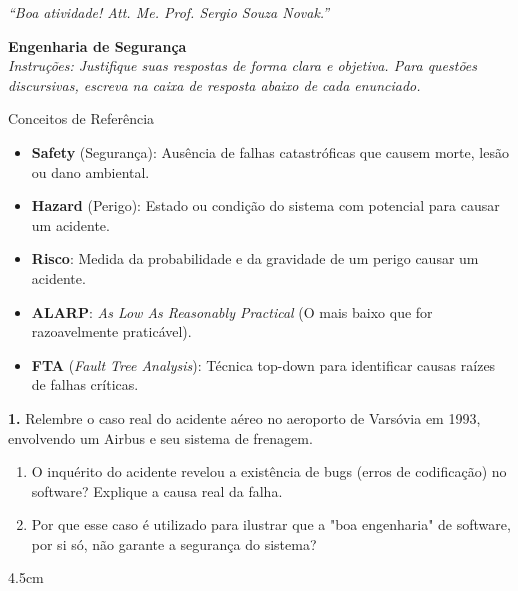 \documentclass[12pt,a4paper,twoside]{report}
\begin{document}
\vspace{0.8cm}

\begin{center}
  \textit{``Boa atividade! Att. Me. Prof. Sergio Souza Novak.''}
\end{center}

\vspace*{0.2cm}

\begin{center}
  {\Large \textbf{Engenharia de Segurança}}\\[0.2cm]
  \textit{Instruções: Justifique suas respostas de forma clara e objetiva.
  Para questões discursivas, escreva na caixa de resposta abaixo de cada enunciado.}
\end{center}

\vspace{0.4cm}

\begin{block}{Conceitos de Referência}
  \small
  \begin{itemize}
    \item \textbf{Safety} (Segurança): Ausência de falhas catastróficas que causem morte, lesão ou dano ambiental.
    \item \textbf{Hazard} (Perigo): Estado ou condição do sistema com potencial para causar um acidente.
    \item \textbf{Risco}: Medida da probabilidade e da gravidade de um perigo causar um acidente.
    \item \textbf{ALARP}: \textit{As Low As Reasonably Practical} (O mais baixo que for razoavelmente praticável).
    \item \textbf{FTA} (\textit{Fault Tree Analysis}): Técnica top-down para identificar causas raízes de falhas críticas.
  \end{itemize}
\end{block}

\vspace{0.5cm}

\textbf{1.} Relembre o caso real do acidente aéreo no aeroporto de Varsóvia em 1993, envolvendo um Airbus e seu sistema de frenagem.

\begin{enumerate}[label=\alph*)]
  \item O inquérito do acidente revelou a existência de bugs (erros de codificação) no software? Explique a causa real da falha.
  \item Por que esse caso é utilizado para ilustrar que a "boa engenharia" de software, por si só, não garante a segurança do sistema?
\end{enumerate}
\begin{resposta}{4.5cm}
\end{resposta}
\end{document}
